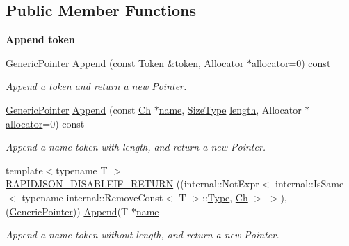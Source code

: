 \subsection*{Public Member Functions}
\begin{Indent}\textbf{ Append token}\par
\begin{DoxyCompactItemize}
\item 
\hyperlink{classGenericPointer}{Generic\+Pointer} \hyperlink{classGenericPointer_aa8f86c0f330807f337351a95ae254b78}{Append} (const \hyperlink{structGenericPointer_1_1Token}{Token} \&token, Allocator $\ast$\hyperlink{classGenericPointer_aeb61ba8e67260b43090791eeca8b90e0}{allocator}=0) const
\begin{DoxyCompactList}\small\item\em Append a token and return a new Pointer. \end{DoxyCompactList}\item 
\hyperlink{classGenericPointer}{Generic\+Pointer} \hyperlink{classGenericPointer_a9f8a1711f5b8e0d951c25c6c65326f77}{Append} (const \hyperlink{classGenericPointer_ab292356c11b4015c98d21b966b11f285}{Ch} $\ast$\hyperlink{imgui__impl__opengl3__loader_8h_a5c4947d4516dd7cfa3505ce3a648a4ef}{name}, \hyperlink{rapidjson_8h_a5ed6e6e67250fadbd041127e6386dcb5}{Size\+Type} \hyperlink{imgui__impl__opengl3__loader_8h_a011fc24f10426c01349e94a4edd4b0d5}{length}, Allocator $\ast$\hyperlink{classGenericPointer_aeb61ba8e67260b43090791eeca8b90e0}{allocator}=0) const
\begin{DoxyCompactList}\small\item\em Append a name token with length, and return a new Pointer. \end{DoxyCompactList}\item 
{\footnotesize template$<$typename T $>$ }\\\hyperlink{classGenericPointer_aaf4d7d852098878d24188d134182d42f}{R\+A\+P\+I\+D\+J\+S\+O\+N\+\_\+\+D\+I\+S\+A\+B\+L\+E\+I\+F\+\_\+\+R\+E\+T\+U\+RN} ((internal\+::\+Not\+Expr$<$ internal\+::\+Is\+Same$<$ typename internal\+::\+Remove\+Const$<$ T $>$\+::\hyperlink{rapidjson_8h_a1d1cfd8ffb84e947f82999c682b666a7}{Type}, \hyperlink{classGenericPointer_ab292356c11b4015c98d21b966b11f285}{Ch} $>$ $>$),(\hyperlink{classGenericPointer}{Generic\+Pointer})) \hyperlink{classGenericPointer_aa8f86c0f330807f337351a95ae254b78}{Append}(T $\ast$\hyperlink{imgui__impl__opengl3__loader_8h_a5c4947d4516dd7cfa3505ce3a648a4ef}{name}
\begin{DoxyCompactList}\small\item\em Append a name token without length, and return a new Pointer. \end{DoxyCompactList}\end{DoxyCompactItemize}
\end{Indent}
